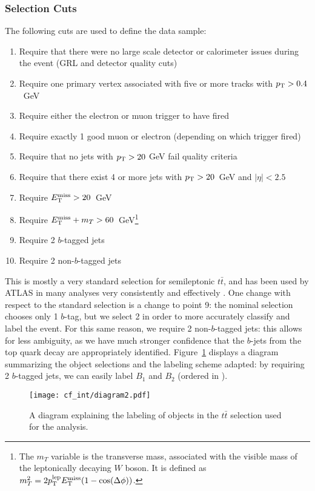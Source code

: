 	\subsubsection{Selection Cuts}

The following cuts are used to define the data sample:
%
\begin{enumerate}
\item Require that there were no large scale detector or calorimeter issues during the event (GRL and detector quality cuts)
\item Require one primary vertex associated with five or more tracks with $p_{\text{T}} > 0.4$~GeV
\item Require either the electron or muon trigger to have fired
\item Require exactly 1 good muon or electron (depending on which trigger fired)
\item Require that no jets with $p_{\text{T}} > 20$ GeV fail quality criteria
\item Require that there exist 4 or more jets with $p_{\text{T}} > 20$~GeV and $|\eta| < 2.5$
\item Require $E_{\text{T}}^{\text{miss}} > 20$~GeV
\item Require $E_{\text{T}}^{\text{miss}} + m_T > 60$~GeV\footnote{The $m_T$ variable is the transverse mass, associated with the visible mass of the leptonically decaying $W$ boson. It is defined as $m_T^2 = 2 p_{\text{T}}^{\mathrm{lep}} E_{\text{T}}^{\text{miss}} (1 - \cos(\Delta \phi))$.}
\item Require 2 $b$-tagged jets
\item Require 2 non-$b$-tagged jets
\end{enumerate}
%
This is mostly a very standard selection for semileptonic $t\bar{t}$, and has been used by ATLAS in many analyses very consistently and effectively . One change with respect to the standard selection is a change to point 9: the nominal selection chooses only 1 $b$-tag, but we select 2 in order to more accurately classify and label the event. For this same reason, we require 2 non-$b$-tagged jets: this allows for less ambiguity, as we have much stronger confidence that the $b$-jets from the top quark decay are appropriately identified. Figure~\ref{fig:color:selection:labeling_diagram} displays a diagram summarizing the object selections and the labeling scheme adapted: by requiring 2 $b$-tagged jets, we can easily label $B_1$ and $B_2$ (ordered in \pt).


\begin{figure}
\centering
\texttt{[image: cf\_int/diagram2.pdf]}
\label{fig:color:selection:labeling_diagram}
\caption{A diagram explaining the labeling of objects in the $t\bar{t}$ selection used for the analysis.}
\end{figure}

